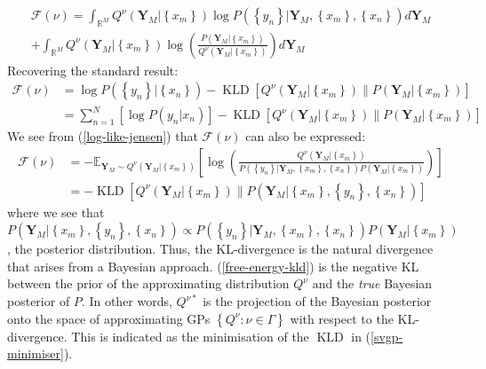 \documentclass{article}
\newcommand{\KLD}{\operatorname{KLD}}
\numberwithin{equation}{section}
\begin{document}
\begin{multline}
    \mathcal{F(\nu)} = \int_{\mathbb{R}^M} Q^{\nu}\left(\mathbf{Y}_M \big\vert \left\{ x_m\right\} \right) \log P\left(\left\{ y_n\right\} \big\vert \mathbf{Y}_M , \left\{ x_m\right\}, \left\{ x_n\right\}\right)d\mathbf{Y}_M
    \\ + \int_{\mathbb{R}^M} Q^{\nu}\left(\mathbf{Y}_M \big\vert \left\{ x_m\right\} \right) \log \left(\frac{P\left(\mathbf{Y}_M \big\vert \left\{ x_m\right\}\right)}{Q^{\nu}\left(\mathbf{Y}_M \big\vert \left\{ x_m\right\} \right)} \right)d\mathbf{Y}_M
\end{multline}
Recovering the standard result:
\begin{align}
    \mathcal{F(\nu)} &=  \log P\left(\left\{ y_n\right\} \big\vert \left\{ x_n\right\}\right) - \KLD\left[Q^{\nu}\left(\mathbf{Y}_M \big\vert \left\{ x_m\right\} \right) \| P\left(\mathbf{Y}_M \big\vert \left\{ x_m\right\} \right)\right]
    \\ &= \sum_{n=1}^N \left[\log P \left(y_n \big\vert  x_n \right)\right] - \KLD\left[Q^{\nu}\left(\mathbf{Y}_M \vert \left\{ x_m\right\} \right) \| P\left(\mathbf{Y}_M \big\vert \left\{ x_m\right\} \right)\right]
\end{align}
We see from (\ref{log-like-jensen}) that $\mathcal{F(\nu)}$ can also be expressed:
\begin{align}
    \mathcal{F(\nu)} &= - \mathbb{E}_{\mathbf{Y}_M \sim Q^{\nu}\left(\mathbf{Y}_M \big\vert \left\{ x_m\right\} \right)} \left[\log \left(\frac{Q^{\nu}\left(\mathbf{Y}_M \big\vert \left\{ x_m\right\} \right)}{P\left(\left\{ y_n\right\} \big\vert \mathbf{Y}_M , \left\{ x_m\right\}, \left\{ x_n\right\}\right)P\left(\mathbf{Y}_M \big\vert \left\{ x_m\right\}\right)} \right) \right]\\
    &= -\KLD \left[Q^{\nu}\left(\mathbf{Y}_M \big\vert \left\{ x_m\right\} \right) \| P\left(\mathbf{Y}_M \big\vert \left\{ x_m\right\}, \left\{ y_n\right\}, \left\{ x_n\right\}\right) \right]
    \label{free-energy-kld}
\end{align}
where we see that $P\left(\mathbf{Y}_M \big\vert \left\{ x_m\right\}, \left\{ y_n\right\}, \left\{ x_n\right\}\right) \propto P\left(\left\{ y_n\right\} \big\vert \mathbf{Y}_M , \left\{ x_m\right\}, \left\{ x_n\right\}\right)P\left(\mathbf{Y}_M \big\vert \left\{ x_m\right\}\right)$, the posterior distribution.
Thus, the KL-divergence is the natural divergence that arises from a Bayesian approach. (\ref{free-energy-kld}) is the negative KL between the prior of the approximating distribution $Q^{\nu}$ and the \textit{true} Bayesian posterior of $P$. In other words, $Q^{\nu*}$ is the projection of the Bayesian posterior onto the space of approximating GPs $\left\{Q^{\nu}: \nu \in \Gamma\right\}$ with respect to the KL-divergence. This is indicated as the minimisation of the $\KLD$ in (\ref{svgp-minimiser}).
\end{document}
